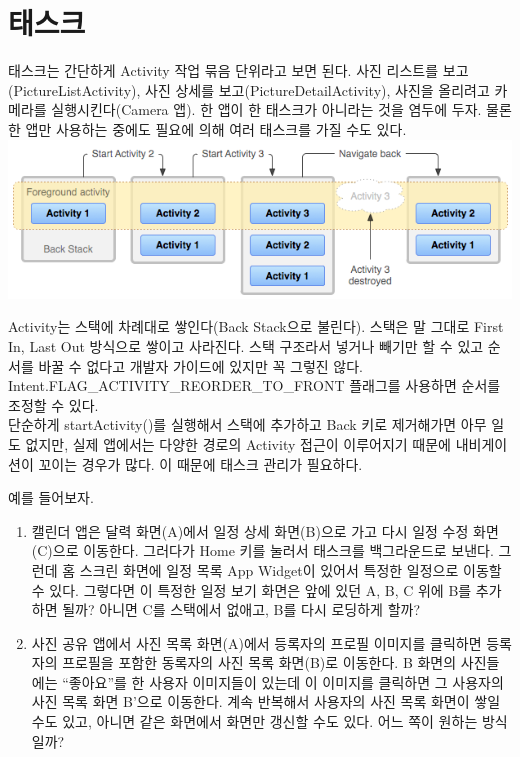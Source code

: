 \section{태스크}
태스크는 간단하게 Activity 작업 묶음 단위라고 보면 된다. 사진 리스트를 보고(PictureListActivity), 사진 상세를 보고(PictureDetailActivity), 사진을 올리려고 카메라를 실행시킨다(Camera 앱).
한 앱이 한 태스크가 아니라는 것을 염두에 두자. 물론 한 앱만 사용하는 중에도 필요에 의해 여러 태스크를 가질 수도 있다.\\
\includegraphics[scale=0.6]{diagram_backstack}

Activity는 스택에 차례대로 쌓인다(Back Stack으로 불린다). 스택은 말 그대로 First In, Last Out 방식으로 쌓이고 사라진다. 스택 구조라서 넣거나 빼기만 할 수 있고 순서를 바꿀 수 없다고 개발자 가이드에 있지만 꼭 그렇진 않다. Intent.FLAG\_ACTIVITY\_REORDER\_TO\_FRONT 플래그를 사용하면 순서를 조정할 수 있다.\\

단순하게 startActivity()를 실행해서 스택에 추가하고 Back 키로 제거해가면 아무 일도 없지만, 실제 앱에서는 다양한 경로의 Activity 접근이 이루어지기 때문에 내비게이션이 꼬이는 경우가 많다. 이 때문에 태스크 관리가 필요하다.

예를 들어보자. 
\begin{enumerate}
\item 캘린더 앱은 달력 화면(A)에서 일정 상세 화면(B)으로 가고 다시 일정 수정 화면(C)으로 이동한다. 그러다가 Home 키를 눌러서 태스크를 백그라운드로 보낸다. 
그런데 홈 스크린 화면에 일정 목록 App Widget이 있어서 특정한 일정으로 이동할 수 있다. 그렇다면 이 특정한 일정 보기 화면은 앞에 있던 A, B, C 위에 B를 추가하면 될까? 아니면 C를 스택에서 없애고, B를 다시 로딩하게 할까?
\item 사진 공유 앱에서 사진 목록 화면(A)에서 등록자의 프로필 이미지를 클릭하면 등록자의 프로필을 포함한 동록자의 사진 목록 화면(B)로 이동한다. B 화면의 사진들에는 ``좋아요''를 한 사용자 이미지들이 있는데 이 이미지를 클릭하면 그 사용자의 사진 목록 화면 B'으로 이동한다. 계속 반복해서 사용자의 사진 목록 화면이 쌓일 수도 있고, 아니면 같은 화면에서 화면만 갱신할 수도 있다. 어느 쪽이 원하는 방식일까?
\end{enumerate}

